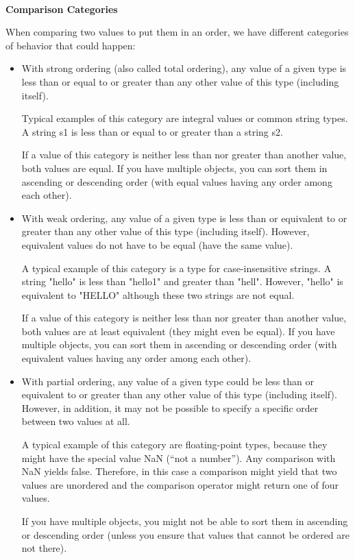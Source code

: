\noindent
\hspace*{\fill} \\ %
\textbf{Comparison Categories}

When comparing two values to put them in an order, we have different categories of behavior that could happen:

\begin{itemize}
\item
With strong ordering (also called total ordering), any value of a given type is less than or equal to or greater than any other value of this type (including itself).

Typical examples of this category are integral values or common string types. A string s1 is less than or equal to or greater than a string s2.

If a value of this category is neither less than nor greater than another value, both values are equal. If you have multiple objects, you can sort them in ascending or descending order (with equal values having any order among each other).

\item
With weak ordering, any value of a given type is less than or equivalent to or greater than any other value of this type (including itself). However, equivalent values do not have to be equal (have the same value).

A typical example of this category is a type for case-insensitive strings. A string "hello" is less than "hello1" and greater than "hell". However, "hello" is equivalent to "HELLO" although these two strings are not equal.

If a value of this category is neither less than nor greater than another value, both values are at least equivalent (they might even be equal). If you have multiple objects, you can sort them in ascending or descending order (with equivalent values having any order among each other).

\item
With partial ordering, any value of a given type could be less than or equivalent to or greater than any other value of this type (including itself). However, in addition, it may not be possible to specify a specific order between two values at all.

A typical example of this category are floating-point types, because they might have the special value NaN (“not a number”). Any comparison with NaN yields false. Therefore, in this case a comparison might yield that two values are unordered and the comparison operator might return one of four values.

If you have multiple objects, you might not be able to sort them in ascending or descending order (unless you ensure that values that cannot be ordered are not there).
\end{itemize}

